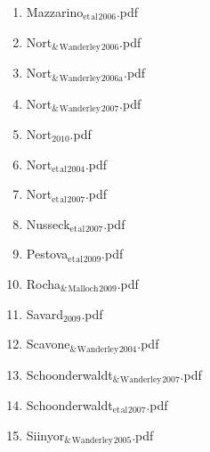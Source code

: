 \documentclass[11pt]{article}
\begin{document}
\begin{enumerate}
\begin{enumerate}
\begin{enumerate}
\item Mazzarino$_{\text{et}}$$_{\text{al}}$$_{\text{2006}}$.pdf
\label{sec-1-1-1-1-49-2-1-7-41}

\item Nort$_{\text{\&}}$$_{\text{Wanderley}}$$_{\text{2006}}$.pdf
\label{sec-1-1-1-1-49-2-1-7-42}

\item Nort$_{\text{\&}}$$_{\text{Wanderley}}$$_{\text{2006a}}$.pdf
\label{sec-1-1-1-1-49-2-1-7-43}

\item Nort$_{\text{\&}}$$_{\text{Wanderley}}$$_{\text{2007}}$.pdf
\label{sec-1-1-1-1-49-2-1-7-44}

\item Nort$_{\text{2010}}$.pdf
\label{sec-1-1-1-1-49-2-1-7-45}

\item Nort$_{\text{et}}$$_{\text{al}}$$_{\text{2004}}$.pdf
\label{sec-1-1-1-1-49-2-1-7-46}

\item Nort$_{\text{et}}$$_{\text{al}}$$_{\text{2007}}$.pdf
\label{sec-1-1-1-1-49-2-1-7-47}

\item Nusseck$_{\text{et}}$$_{\text{al}}$$_{\text{2007}}$.pdf
\label{sec-1-1-1-1-49-2-1-7-48}

\item Pestova$_{\text{et}}$$_{\text{al}}$$_{\text{2009}}$.pdf
\label{sec-1-1-1-1-49-2-1-7-49}

\item Rocha$_{\text{\&}}$$_{\text{Malloch}}$$_{\text{2009}}$.pdf
\label{sec-1-1-1-1-49-2-1-7-50}

\item Savard$_{\text{2009}}$.pdf
\label{sec-1-1-1-1-49-2-1-7-51}

\item Scavone$_{\text{\&}}$$_{\text{Wanderley}}$$_{\text{2004}}$.pdf
\label{sec-1-1-1-1-49-2-1-7-52}

\item Schoonderwaldt$_{\text{\&}}$$_{\text{Wanderley}}$$_{\text{2007}}$.pdf
\label{sec-1-1-1-1-49-2-1-7-53}

\item Schoonderwaldt$_{\text{et}}$$_{\text{al}}$$_{\text{2007}}$.pdf
\label{sec-1-1-1-1-49-2-1-7-54}

\item Siinyor$_{\text{\&}}$$_{\text{Wanderley}}$$_{\text{2005}}$.pdf
\label{sec-1-1-1-1-49-2-1-7-55}


\end{enumerate}
\end{enumerate}
\end{enumerate}
\end{document}
